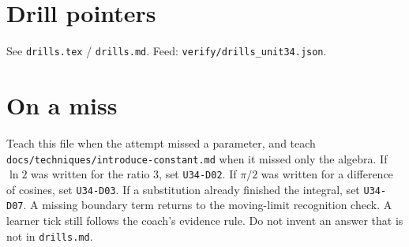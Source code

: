 \section{Drill pointers}
See \texttt{drills.tex} / \texttt{drills.md}. Feed: \texttt{verify/drills\_unit34.json}.

\section*{On a miss}
Teach this file when the attempt missed a parameter, and teach \texttt{docs/techniques/introduce-constant.md} when it missed only the algebra. If $\ln 2$ was written for the ratio $3$, set \texttt{U34-D02}. If $\pi/2$ was written for a difference of cosines, set \texttt{U34-D03}. If a substitution already finished the integral, set \texttt{U34-D07}. A missing boundary term returns to the moving-limit recognition check. A learner tick still follows the coach's evidence rule. Do not invent an answer that is not in \texttt{drills.md}.

